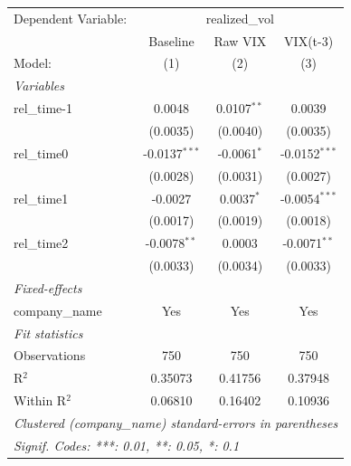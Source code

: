 
\begingroup
\centering
\begin{tabular}{lccc}
   \tabularnewline \midrule \midrule
   Dependent Variable: & \multicolumn{3}{c}{realized\_vol}\\
                  & Baseline        & Raw VIX       & VIX(t-3) \\   
   Model:         & (1)             & (2)           & (3)\\  
   \midrule
   \emph{Variables}\\
   rel\_time-1    & 0.0048          & 0.0107$^{**}$ & 0.0039\\   
                  & (0.0035)        & (0.0040)      & (0.0035)\\   
   rel\_time0     & -0.0137$^{***}$ & -0.0061$^{*}$ & -0.0152$^{***}$\\   
                  & (0.0028)        & (0.0031)      & (0.0027)\\   
   rel\_time1     & -0.0027         & 0.0037$^{*}$  & -0.0054$^{***}$\\   
                  & (0.0017)        & (0.0019)      & (0.0018)\\   
   rel\_time2     & -0.0078$^{**}$  & 0.0003        & -0.0071$^{**}$\\   
                  & (0.0033)        & (0.0034)      & (0.0033)\\   
   \midrule
   \emph{Fixed-effects}\\
   company\_name  & Yes             & Yes           & Yes\\  
   \midrule
   \emph{Fit statistics}\\
   Observations   & 750             & 750           & 750\\  
   R$^2$          & 0.35073         & 0.41756       & 0.37948\\  
   Within R$^2$   & 0.06810         & 0.16402       & 0.10936\\  
   \midrule \midrule
   \multicolumn{4}{l}{\emph{Clustered (company\_name) standard-errors in parentheses}}\\
   \multicolumn{4}{l}{\emph{Signif. Codes: ***: 0.01, **: 0.05, *: 0.1}}\\
\end{tabular}
\par\endgroup


